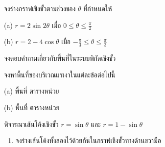 \documentclass[12pt,final]{novelette} %
\begin{document}
\begin{question}
\begin{question}
        \item จงร่างกราฟเชิงขั้วตามช่วงของ $\theta$ ที่กำหนดให้

        \medskip
        \begin{minipage}{0.44\textwidth}
            (a) $r = 2 \sin 2 \theta$ เมื่อ $0 \leq \theta \leq \frac\pi2$
            \polarcoordinatecircle
        \end{minipage}
        \begin{minipage}{0.44\textwidth}
            (b) $r = 2 - 4 \cos \theta$ เมื่อ $-\frac\pi3 \leq \theta \leq \frac\pi3$
            \polarcoordinatecircle
        \end{minipage}
    \end{question}

    \clearpage

    \item {}
     จงตอบคำถามเกี่ยวกับพื้นที่ในระบบพิกัดเชิงขั้ว
    \begin{question}
        \item จงหาพื้นที่ของบริเวณแรเงาในแต่ละข้อต่อไปนี้

        \bigskip
        \begin{minipage}[b]{0.44\textwidth}
            (a)
            \vspace*{-0.3cm}
            \polarcoordinatetheta
            พื้นที่ \ansboxs ตารางหน่วย
        \end{minipage}
        \begin{minipage}[b]{0.44\textwidth}
            (b)
            \vspace*{-0.33cm}
            \polarcoordinatesintwotheta
            พื้นที่ \ansboxs ตารางหน่วย
        \end{minipage}

        \vspace{2cm plus 1cm minus 1cm}

        \item พิจารณาเส้นโค้งเชิงขั้ว $r = \sin \theta$ และ $r = 1 - \sin \theta$
        \begin{enumerate}[label=(\alph*),topsep=1.5em,itemsep=3em]
            \item จงร่างเส้นโค้งทั้งสองไว้ด้วยกันในกราฟเชิงขั้วทางด้านขวามือ



\end{enumerate}
\end{question}
\end{question}
\end{document}
